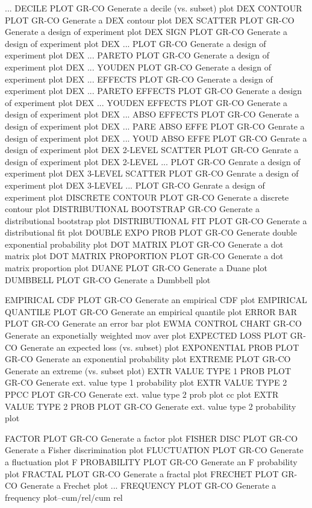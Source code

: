 ... DECILE PLOT             GR-CO Generate a decile (vs. subset) plot
DEX CONTOUR PLOT            GR-CO Generate a DEX contour plot
DEX SCATTER PLOT            GR-CO Generate a design of experiment plot
DEX SIGN PLOT               GR-CO Generate a design of experiment plot
DEX ... PLOT                GR-CO Generate a design of experiment plot
DEX ... PARETO PLOT         GR-CO Generate a design of experiment plot
DEX ... YOUDEN PLOT         GR-CO Generate a design of experiment plot
DEX ... EFFECTS PLOT        GR-CO Generate a design of experiment plot
DEX ... PARETO EFFECTS PLOT GR-CO Generate a design of experiment plot
DEX ... YOUDEN EFFECTS PLOT GR-CO Generate a design of experiment plot
DEX ... ABSO EFFECTS PLOT   GR-CO Generate a design of experiment plot
DEX ... PARE ABSO EFFE PLOT GR-CO Genrate a design of experiment plot
DEX ... YOUD ABSO EFFE PLOT GR-CO Genrate a design of experiment plot
DEX 2-LEVEL SCATTER PLOT    GR-CO Genrate a design of experiment plot
DEX 2-LEVEL ... PLOT        GR-CO Genrate a design of experiment plot
DEX 3-LEVEL SCATTER PLOT    GR-CO Genrate a design of experiment plot
DEX 3-LEVEL ... PLOT        GR-CO Genrate a design of experiment plot
DISCRETE CONTOUR PLOT       GR-CO Generate a discrete contour plot
DISTRIBUTIONAL BOOTSTRAP    GR-CO Generate a distributional bootstrap plot
DISTRIBUTIONAL FIT PLOT     GR-CO Generate a distributional fit plot
DOUBLE EXPO PROB PLOT       GR-CO Generate double exponential probability plot
DOT MATRIX PLOT             GR-CO Generate a dot matrix plot
DOT MATRIX PROPORTION PLOT  GR-CO Generate a dot matrix proportion plot
DUANE PLOT                  GR-CO Generate a Duane plot
DUMBBELL PLOT               GR-CO Generate a Dumbbell plot

EMPIRICAL CDF PLOT          GR-CO Generate an empirical CDF plot
EMPIRICAL QUANTILE PLOT     GR-CO Generate an empirical quantile plot
ERROR BAR PLOT              GR-CO Generate an error bar plot
EWMA CONTROL CHART          GR-CO Generate an exponetially weighted mov aver plot
EXPECTED LOSS PLOT          GR-CO Generate an expected loss (vs. subset) plot
EXPONENTIAL PROB PLOT       GR-CO Generate an exponential probability plot
EXTREME PLOT                GR-CO Generate an extreme (vs. subset plot)
EXTR VALUE TYPE 1 PROB PLOT GR-CO Generate ext. value type 1 probability plot
EXTR VALUE TYPE 2 PPCC PLOT GR-CO Generate ext. value type 2 prob plot cc plot
EXTR VALUE TYPE 2 PROB PLOT GR-CO Generate ext. value type 2 probability plot

FACTOR PLOT                 GR-CO Generate  a factor plot
FISHER DISC PLOT            GR-CO Generate a Fisher discrimination plot
FLUCTUATION PLOT            GR-CO Generate  a fluctuation plot
F PROBABILITY PLOT          GR-CO Generate an F probability plot
FRACTAL PLOT                GR-CO Generate a fractal plot
FRECHET PLOT                GR-CO Generate a Frechet plot
... FREQUENCY PLOT          GR-CO Generate a frequency plot--cum/rel/cum rel

